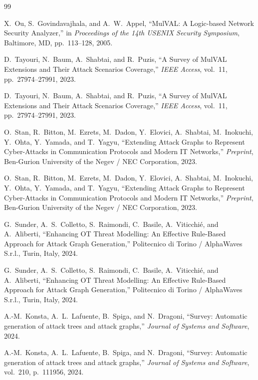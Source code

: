 \documentclass[target=mst,aauheader=aics,style=]{thud}
\begin{document}
\begin{thebibliography}{99}

X.~Ou, S.~Govindavajhala, and A.~W.~Appel, 
``MulVAL: A Logic-based Network Security Analyzer,'' 
in \emph{Proceedings of the 14th USENIX Security Symposium}, Baltimore, MD, pp.~113--128, 2005.

D.~Tayouri, N.~Baum, A.~Shabtai, and R.~Puzis, 
``A Survey of MulVAL Extensions and Their Attack Scenarios Coverage,'' 
\emph{IEEE Access}, vol.~11, pp.~27974--27991, 2023.

D.~Tayouri, N.~Baum, A.~Shabtai, and R.~Puzis,
``A Survey of MulVAL Extensions and Their Attack Scenarios Coverage,''
\emph{IEEE Access}, vol.~11, pp.~27974--27991, 2023.

O.~Stan, R.~Bitton, M.~Ezrets, M.~Dadon, Y.~Elovici, A.~Shabtai, M.~Inokuchi, Y.~Ohta, Y.~Yamada, and T.~Yagyu, 
``Extending Attack Graphs to Represent Cyber-Attacks in Communication Protocols and Modern IT Networks,'' 
\emph{Preprint}, Ben-Gurion University of the Negev / NEC Corporation, 2023.

O.~Stan, R.~Bitton, M.~Ezrets, M.~Dadon, Y.~Elovici, A.~Shabtai, M.~Inokuchi, Y.~Ohta, Y.~Yamada, and T.~Yagyu,
``Extending Attack Graphs to Represent Cyber-Attacks in Communication Protocols and Modern IT Networks,''
\emph{Preprint}, Ben-Gurion University of the Negev / NEC Corporation, 2023.

G.~Sunder, A.~S.~Colletto, S.~Raimondi, C.~Basile, A.~Viticchi\'e, and A.~Aliberti, 
``Enhancing OT Threat Modelling: An Effective Rule-Based Approach for Attack Graph Generation,'' 
Politecnico di Torino / AlphaWaves S.r.l., Turin, Italy, 2024.

G.~Sunder, A.~S.~Colletto, S.~Raimondi, C.~Basile, A.~Viticchi\'e, and A.~Aliberti,
``Enhancing OT Threat Modelling: An Effective Rule-Based Approach for Attack Graph Generation,''
Politecnico di Torino / AlphaWaves S.r.l., Turin, Italy, 2024.

A.-M.~Konsta, A.~L.~Lafuente, B.~Spiga, and N.~Dragoni, 
``Survey: Automatic generation of attack trees and attack graphs,'' 
\emph{Journal of Systems and Software}, 2024.

A.-M.~Konsta, A.~L.~Lafuente, B.~Spiga, and N.~Dragoni,
``Survey: Automatic generation of attack trees and attack graphs,''
\emph{Journal of Systems and Software}, vol.~210, p.~111956, 2024.


\end{thebibliography}
\end{document}
